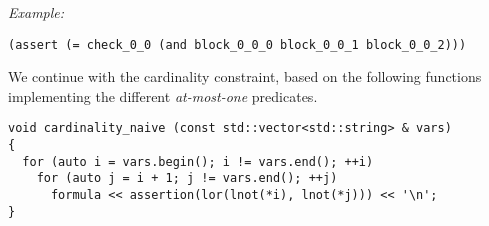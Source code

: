 
\noindent
\emph{Example:} 

\begin{lstlisting}[style=smtlib]
(assert (= check_0_0 (and block_0_0_0 block_0_0_1 block_0_0_2)))
\end{lstlisting}


%
%

\noindent
We continue with the cardinality constraint, based on the following functions implementing the different \emph{at-most-one} predicates.

\begin{lstlisting}[style=c++]
void cardinality_naive (const std::vector<std::string> & vars)
{
  for (auto i = vars.begin(); i != vars.end(); ++i)
    for (auto j = i + 1; j != vars.end(); ++j)
      formula << assertion(lor(lnot(*i), lnot(*j))) << '\n';
}
\end{lstlisting}


